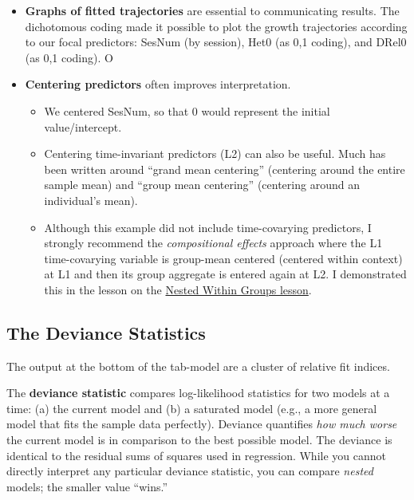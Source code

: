 \documentclass[
  english,
]{book}
\providecommand{\tightlist}{%
  \setlength{\itemsep}{0pt}\setlength{\parskip}{0pt}}
\begin{document}
\begin{itemize}
\item
  \textbf{Graphs of fitted trajectories} are essential to communicating results. The dichotomous coding made it possible to plot the growth trajectories according to our focal predictors: SesNum (by session), Het0 (as 0,1 coding), and DRel0 (as 0,1 coding). O
\item
  \textbf{Centering predictors} often improves interpretation.

  \begin{itemize}
  \tightlist
  \item
    We centered SesNum, so that 0 would represent the initial value/intercept.
  \item
    Centering time-invariant predictors (L2) can also be useful. Much has been written around ``grand mean centering'' (centering around the entire sample mean) and ``group mean centering'' (centering around an individual's mean).\\
  \item
    Although this example did not include time-covarying predictors, I strongly recommend the \emph{compositional effects} \citep{enders_centering_2007} approach where the L1 time-covarying variable is group-mean centered (centered within context) at L1 and then its group aggregate is entered again at L2. I demonstrated this in the lesson on the \protect\hyperlink{wGroups}{Nested Within Groups lesson}.
  \end{itemize}
\end{itemize}

\hypertarget{the-deviance-statistics}{%
\subsection{The Deviance Statistics}\label{the-deviance-statistics}}

The output at the bottom of the tab-model are a cluster of relative fit indices.

The \textbf{deviance statistic} compares log-likelihood statistics for two models at a time: (a) the current model and (b) a saturated model (e.g., a more general model that fits the sample data perfectly). Deviance quantifies \emph{how much worse} the current model is in comparison to the best possible model. The deviance is identical to the residual sums of squares used in regression. While you cannot directly interpret any particular deviance statistic, you can compare \emph{nested} models; the smaller value ``wins.''
\end{document}
